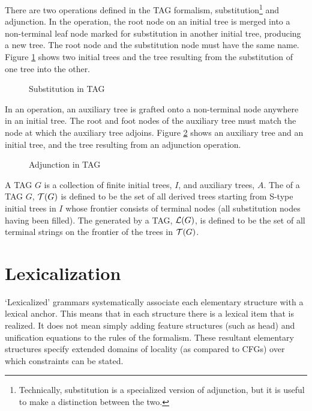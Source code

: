 There are two operations defined in the TAG formalism,
substitution\footnote{Technically, substitution is a specialized version of
adjunction, but it is useful to make a distinction between the two.} and
adjunction.  In the  operation, the root node on an
initial tree is merged into a non-terminal leaf node marked for substitution in
another initial tree, producing a new tree.  The root node and the substitution
node must have the same name.  Figure \ref{proto-subst} shows two initial trees
and the tree resulting from the substitution of one tree into the other.

\begin{figure}[htb]
\centering
{}
\caption{Substitution in TAG}
\label{proto-subst}
\end{figure}

In an  operation, an auxiliary tree is grafted onto a
non-terminal node anywhere in an initial tree.  The root and foot nodes of the
auxiliary tree must match the node at which the auxiliary tree adjoins.  Figure
\ref{proto-adjunction} shows an auxiliary tree and an initial tree, and the
tree resulting from an adjunction operation.

\begin{figure}[htb]
\centering
{}
\caption{Adjunction in TAG}
\label{proto-adjunction}
\end{figure}

A TAG $G$ is a collection of finite initial trees, $I$, and auxiliary trees,
$A$.  The  of a TAG $G$, ${\cal T}(G)$ is defined to be the
set of all derived trees starting from S-type initial trees in $I$ whose
frontier consists of terminal nodes (all substitution nodes having been
filled). The  generated by a TAG, ${\cal L}(G)$, is
defined to be the set of all terminal strings on the frontier of the trees in
${\cal T}(G)$.

\section{Lexicalization}

`Lexicalized' grammars systematically associate each elementary structure with
a lexical anchor. This means that in each structure there is a lexical item
that is realized.  It does not mean simply adding feature structures (such as
head) and unification equations to the rules of the formalism.  These resultant
elementary structures specify extended domains of locality (as compared to
CFGs) over which constraints can be stated.

